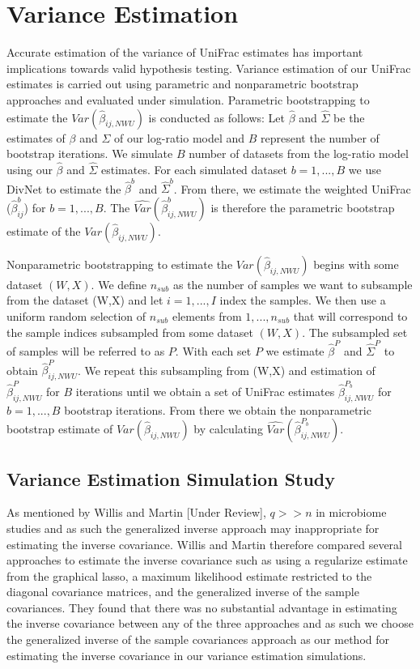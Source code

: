 \documentclass{article}
\newcommand*{\myfont}{\fontfamily{lmtt}\selectfont}
\begin{document}
\section{Variance Estimation}
Accurate estimation of the variance of UniFrac estimates has important implications towards valid hypothesis testing. Variance estimation of our UniFrac estimates is carried out using parametric and nonparametric bootstrap approaches and evaluated under simulation.
Parametric bootstrapping to estimate the $Var(\hat{\beta}_{ij,NWU})$ is conducted as follows:
Let $\hat{\beta}$ and $\hat{\Sigma}$ be the estimates of $\beta$ and $\Sigma$ of our log-ratio model and $B$ represent the number of bootstrap iterations. We simulate $B$ number of datasets from the log-ratio model using our $\hat{\beta}$ and $\hat{\Sigma}$ estimates.  For each simulated dataset $b=1,...,B$ we use {\myfont DivNet} to estimate the $\hat{\beta}^{b}$ and $\hat{\Sigma}^{b}$. From there,  we estimate the weighted UniFrac ($\hat{\beta}_{ij}^{b}$) for $b=1,...,B$. The $\widehat{Var}(\hat{\beta}_{ij,NWU}^{b})$ is therefore the parametric bootstrap estimate of the $Var(\hat{\beta}_{ij,NWU})$.

Nonparametric bootstrapping to estimate the $Var(\hat{\beta}_{ij,NWU})$ begins with some dataset $(W,X)$. We define $n_{sub}$ as the number of samples we want to subsample from the dataset (W,X) and let $i = 1,...,I$ index the samples. We then use a uniform random selection of $n_{sub}$ elements from ${1,...,n_{sub}}$ that will correspond to the sample indices subsampled from some dataset $(W,X)$. The subsampled set of samples will be referred to as $P$. With each set $P$ we estimate $\hat{\beta}^{P}$ and $\hat{\Sigma}^{P}$ to obtain $\hat{\beta}_{ij,NWU}^{P}$. We repeat this subsampling from (W,X) and estimation of $\hat{\beta}_{ij,NWU}^{P}$ for $B$ iterations until we obtain a set of UniFrac estimates $\hat{\beta}_{ij,NWU}^{P_{b}}$ for $b = 1,...,B$ bootstrap iterations. From there we obtain the nonparametric bootstrap estimate of $Var(\hat{\beta}_{ij,NWU})$ by calculating $\widehat{Var}(\hat{\beta}_{ij,NWU}^{P_{b}})$.

\subsection{Variance Estimation Simulation Study}
As mentioned by Willis and Martin [Under Review], $q>>n$ in microbiome studies and as such the generalized inverse approach may inappropriate for estimating the inverse covariance. Willis and Martin therefore compared several approaches to estimate the inverse covariance such as using a regularize estimate from the graphical lasso, a maximum likelihood estimate restricted to the diagonal covariance matrices, and the generalized inverse of the sample covariances. They found that there was no substantial advantage in estimating the inverse covariance between any of the three approaches and as such we choose the generalized inverse of the sample covariances approach as our method for estimating the inverse covariance in our variance estimation simulations.
\end{document}
